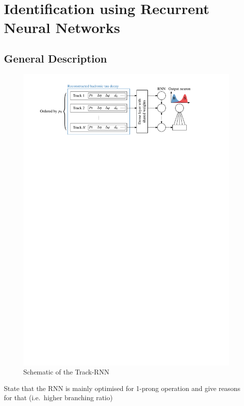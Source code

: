 \section{Identification using Recurrent Neural Networks}
\label{sec:rnn_id}

\subsection{General Description}
\label{sec:rnn_descr}

\begin{figure}[ht]
  \centering
  \includegraphics{./figures/rnn/track_rnn_schematic.pdf}
  \caption{Schematic of the Track-RNN}
  \label{fig:track_rnn_schematic}
\end{figure}

State that the RNN is mainly optimised for 1-prong operation and give reasons
for that (i.e.\ higher branching ratio)

